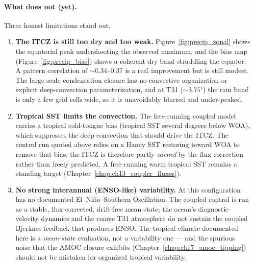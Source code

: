 \paragraph{What does not (yet).} Three honest limitations stand out.

\begin{enumerate}[leftmargin=*]
  \item \textbf{The ITCZ is still too dry and too weak.} Figure~\ref{fig:precip_zonal} shows the
    equatorial peak undershooting the observed maximum, and the bias map
    (Figure~\ref{fig:precip_bias}) shows a coherent dry band straddling the equator. A pattern
    correlation of $\sim0.34$--$0.37$ is a real improvement but is still modest. The large-scale
    condensation closure has no convective organization or explicit deep-convection
    parameterization, and at T31 ($\sim3.75^\circ$) the rain band is only a few grid cells wide,
    so it is unavoidably blurred and under-peaked.
  \item \textbf{Tropical SST limits the convection.} The free-running coupled model carries a
    tropical cold-tongue bias (tropical SST several degrees below WOA), which suppresses the deep
    convection that should drive the ITCZ. The control run quoted above relies on a Haney SST
    restoring \citep{haney1971} toward WOA to remove that bias; the ITCZ is therefore partly \emph{earned} by the
    flux correction rather than freely predicted. A free-running warm tropical SST remains a
    standing target (Chapter~\ref{chap:ch13_coupler_fluxes}).
  \item \textbf{No strong interannual (ENSO-like) variability.} At this configuration \model{}
    has no documented El~Ni\~no--Southern Oscillation. The coupled control is run as a stable,
    flux-corrected, drift-free mean state; the ocean's diagnostic-velocity dynamics and the
    coarse T31 atmosphere do not sustain the coupled Bjerknes feedback that produces ENSO. The
    tropical climate documented here is a \emph{mean-state} evaluation, not a variability one ---
    and the spurious noise that the AMOC closure exhibits (Chapter~\ref{chap:ch17_amoc_tipping})
    should not be mistaken for organized tropical variability.
\end{enumerate}

